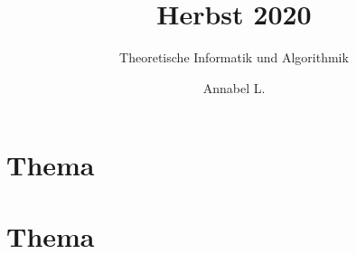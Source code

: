 \documentclass[stex]{ddifau}
\title{Herbst 2020}
\subtitle{Theoretische Informatik und Algorithmik}
\author{Annabel L.}
\begin{document}
\maketitle

\section{Thema}

\clearpage

\section{Thema}

\end{document}
